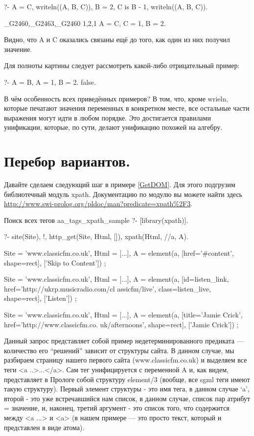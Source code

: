 \documentclass[a4paper]{book}
\begin{document}
\begin{example}{}{}
?- A = C, writeln((A, B, C)), B = 2, C is B - 1, writeln((A, B,
  C)).

_G2460,_G2463,_G2460
1,2,1
A = C, C = 1,
B = 2.
\end{example}

Видно, что A и C оказались связаны ещё до того, как один из них
получил значение.

Для полноты картины следует рассмотреть какой-либо отрицательный
пример:

\begin{example}{}{}
?- A = B, A = 1, B = 2.
false.
\end{example}

В чём особенность всех приведённых примеров? В том, что, кроме
wrieln, которые печатают значения переменных в конкретном месте,
все остальные части выражения могут идти в любом порядке. Это
достигается правилами унификации, которые, по сути, делают
унификацию похожей на алгебру.

\section{Перебор вариантов.}

Давайте сделаем следующий шаг в примере \ref{GetDOM}. Для этого
подгрузим библиотечный модуль xpath. Документацию по модулю вы
можете найти здесь
\url{http://www.swi-prolog.org/pldoc/man?predicate=xpath%2F3}.

\begin{example}{Поиск всех тегов a}{a_tags_xpath_sample}
?- [library(xpath)].

?- site(Site), !, http_get(Site, Html, []), xpath(Html, //a, A).

Site = 'www.classicfm.co.uk',
Html = [...],       
A = element(a, [href='#content', shape=rect], ['Skip to
  Content']) 
;                                                                

Site = 'www.classicfm.co.uk',
Html = [...],       
A = element(a, [id=listen_link, href='http://ukrp.musicradio.com/cl
assicfm/live', class=listen_live, shape=rect], ['Listen']) 
;
      
Site = 'www.classicfm.co.uk',
Html = [...],       
A = element(a, [title='Jamie Crick', href='http://www.classicfm.co.
uk/afternoons', shape=rect], ['Jamie Crick'])
;

\end{example}

Данный запрос представляет собой пример недетерминированного
предиката --- количество его ``решений'' зависит от структуры
сайта. В данном случае, мы разбираем страницу нашего первого
сайта (www.classicfm.co.uk) и выделяем все теги <a
..>...</a>. Сам тег унифицируется с переменной A и, как видем,
представляет в Прологе собой структуру element/3 (вообще, все
sgml теги имеют такую структуру). Первый элемент структуры - это
имя тега, в данном случае `a', второй - это уже встречавшийся нам
список, в данном случае, список пар атрибут = значение, и,
наконец, третий аргумент - это список того, что содержится между
<a ...> и <a> (в нашем примере --- это просто текст, который и
представлен в виде атома).
\end{document}
